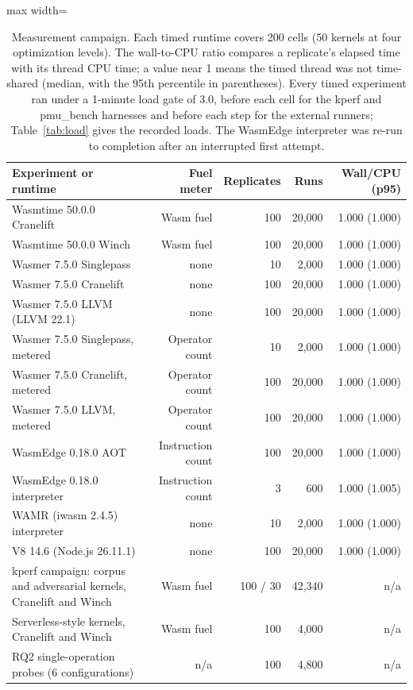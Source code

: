 \begin{table}[t]
\centering
\caption{Measurement campaign. Each timed runtime covers 200 cells (50 kernels at four optimization levels). The wall-to-CPU ratio compares a replicate's elapsed time with its thread CPU time; a value near 1 means the timed thread was not time-shared (median, with the 95th percentile in parentheses). Every timed experiment ran under a 1-minute load gate of 3.0, before each cell for the kperf and pmu\_bench harnesses and before each step for the external runners; Table~\ref{tab:load} gives the recorded loads. The WasmEdge interpreter was re-run to completion after an interrupted first attempt.}
\label{tab:campaign}
\begin{adjustbox}{max width=\textwidth}%
\begin{tabular}{lrrrr}
\toprule
Experiment or runtime & Fuel meter & Replicates & Runs & Wall/CPU (p95) \\
\midrule
Wasmtime 50.0.0 Cranelift & Wasm fuel & 100 & 20,000 & 1.000 (1.000) \\
Wasmtime 50.0.0 Winch & Wasm fuel & 100 & 20,000 & 1.000 (1.000) \\
Wasmer 7.5.0 Singlepass & none & 10 & 2,000 & 1.000 (1.000) \\
Wasmer 7.5.0 Cranelift & none & 100 & 20,000 & 1.000 (1.000) \\
Wasmer 7.5.0 LLVM (LLVM 22.1) & none & 100 & 20,000 & 1.000 (1.000) \\
Wasmer 7.5.0 Singlepass, metered & Operator count & 10 & 2,000 & 1.000 (1.000) \\
Wasmer 7.5.0 Cranelift, metered & Operator count & 100 & 20,000 & 1.000 (1.000) \\
Wasmer 7.5.0 LLVM, metered & Operator count & 100 & 20,000 & 1.000 (1.000) \\
WasmEdge 0.18.0 AOT & Instruction count & 100 & 20,000 & 1.000 (1.000) \\
WasmEdge 0.18.0 interpreter & Instruction count & 3 & 600 & 1.000 (1.005) \\
WAMR (iwasm 2.4.5) interpreter & none & 10 & 2,000 & 1.000 (1.000) \\
V8 14.6 (Node.js 26.11.1) & none & 100 & 20,000 & 1.000 (1.000) \\
kperf campaign: corpus and adversarial kernels, Cranelift and Winch & Wasm fuel & 100 / 30 & 42,340 & n/a \\
Serverless-style kernels, Cranelift and Winch & Wasm fuel & 100 & 4,000 & n/a \\
RQ2 single-operation probes (6 configurations) & n/a & 100 & 4,800 & n/a \\

\end{tabular}
\end{adjustbox}
\end{table}
